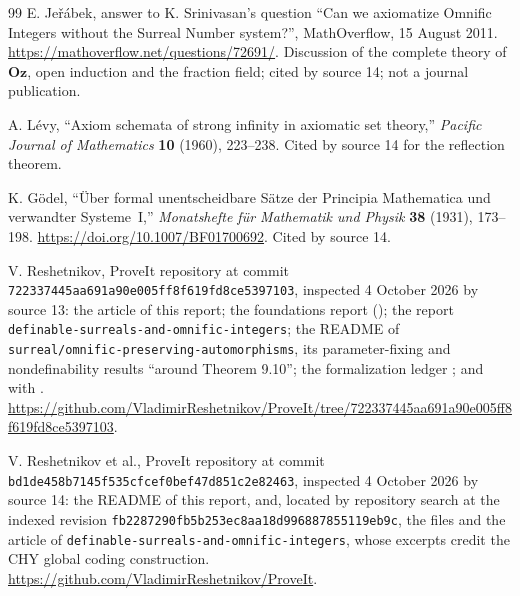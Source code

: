\documentclass[11pt,letterpaper]{article}
\theoremstyle{definition}
\theoremstyle{remark}
\newcommand{\repo}[1]{\nolinkurl{#1}}
\newcommand{\Oz}{\mathbf{Oz}}
\begin{document}
\begin{thebibliography}{99}
E. Je\v{r}\'abek, answer to K. Srinivasan's question ``Can we axiomatize Omnific
Integers without the Surreal Number system?'', MathOverflow, 15 August 2011.
\url{https://mathoverflow.net/questions/72691/}. Discussion of the complete theory of
$\Oz$, open induction and the fraction field; cited by source 14; not a journal
publication.

A. L\'evy, ``Axiom schemata of strong infinity in axiomatic set theory,''
\emph{Pacific Journal of Mathematics} \textbf{10} (1960), 223--238. Cited by source
14 for the reflection theorem.

K. G\"odel, ``\"Uber formal unentscheidbare S\"atze der Principia Mathematica und
verwandter Systeme~I,'' \emph{Monatshefte f\"ur Mathematik und Physik} \textbf{38}
(1931), 173--198. \url{https://doi.org/10.1007/BF01700692}. Cited by source 14.

V. Reshetnikov, ProveIt repository at commit
\texttt{722337445aa691a90e005ff8f619fd8ce5397103}, inspected 4 October 2026 by source
13: the article of this report; the foundations report
(); the
report \repo{definable-surreals-and-omnific-integers}; the README of
\repo{surreal/omnific-preserving-automorphisms}, its parameter-fixing and
nondefinability results ``around Theorem 9.10''; the formalization ledger
; and  with
.
\url{https://github.com/VladimirReshetnikov/ProveIt/tree/722337445aa691a90e005ff8f619fd8ce5397103}.

V. Reshetnikov et al., ProveIt repository at commit
\texttt{bd1de458b7145f535cfcef0bef47d851c2e82463}, inspected 4 October 2026 by source
14: the README of this report, and, located by repository search at the indexed
revision \texttt{fb2287290fb5b253ec8aa18d996887855119eb9c}, the files
 and the article of
\repo{definable-surreals-and-omnific-integers}, whose excerpts credit the CHY global
coding construction. \url{https://github.com/VladimirReshetnikov/ProveIt}.
\end{thebibliography}
\end{document}
